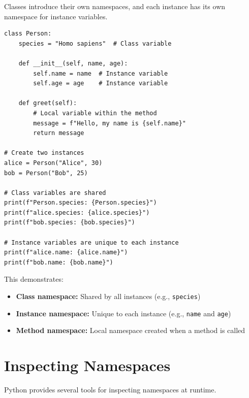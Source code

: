 \documentclass[12pt,letterpaper]{article}
\newenvironment{macterminal}{%
    \begin{mdframed}[
        linecolor=terminalFrame,
        backgroundcolor=terminalBg,
        roundcorner=5pt,
        skipabove=10pt,
        skipbelow=10pt,
        linewidth=1pt,
        innertopmargin=10pt, %
        frametitle={%
            \tikz[baseline=(current bounding box.east), outer sep=0pt]{
                \fill[red!80!black] (0,0) circle (5pt);
                \fill[yellow!80!black] (0.7,0) circle (5pt);
                \fill[green!70!black] (1.4,0) circle (5pt);
            }
        },
        frametitlealignment=\raggedright, %
        frametitleaboveskip=8pt, %
        frametitlebelowskip=0pt, %
    ]
}{%
    \end{mdframed}%
}
\begin{document}
Classes introduce their own namespaces, and each instance has its own namespace for instance variables.

\begin{macterminal}
\begin{lstlisting}
class Person:
    species = "Homo sapiens"  # Class variable
    
    def __init__(self, name, age):
        self.name = name  # Instance variable
        self.age = age    # Instance variable
    
    def greet(self):
        # Local variable within the method
        message = f"Hello, my name is {self.name}"
        return message

# Create two instances
alice = Person("Alice", 30)
bob = Person("Bob", 25)

# Class variables are shared
print(f"Person.species: {Person.species}")
print(f"alice.species: {alice.species}")
print(f"bob.species: {bob.species}")

# Instance variables are unique to each instance
print(f"alice.name: {alice.name}")
print(f"bob.name: {bob.name}")
\end{lstlisting}
\end{macterminal}

This demonstrates:
\begin{itemize}
    \item \textbf{Class namespace:} Shared by all instances (e.g., \texttt{species})
    \item \textbf{Instance namespace:} Unique to each instance (e.g., \texttt{name} and \texttt{age})
    \item \textbf{Method namespace:} Local namespace created when a method is called
\end{itemize}

\section{Inspecting Namespaces}

Python provides several tools for inspecting namespaces at runtime.
\end{document}
